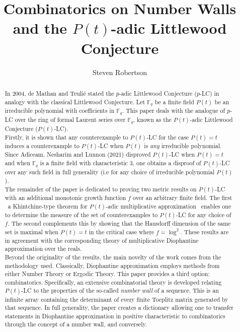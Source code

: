 \documentclass{article}
\title{Combinatorics on Number Walls and the $P(t)$-adic Littlewood Conjecture}
\author{Steven Robertson}
\date{}
\theoremstyle{definition}
\newcommand{\F}{\mathbb{F}}
\numberwithin{equation}{subsection}
\begin{document}
\maketitle
\begin{abstract}
    \noindent In 2004, de Mathan and Teulié stated the $p$-adic Littlewood Conjecture ($p$-LC) in analogy with the classical Littlewood Conjecture. Let $\F_q$ be a finite field $P(t)$ be an irreducible polynomial with coefficients in $\F_q$. This paper deals with the analogue of $p$-LC over the ring of formal Laurent series over $\F_q$, known as the $P(t)$-adic Littlewood Conjecture ($P(t)$-LC). \\

    \noindent Firstly, it is shown that any counterexample to $P(t)$-LC for the case $P(t)=t$ induces a counterexample to $P(t)$-LC when $P(t)$ is \textit{any} irreducible polynomial. Since Adiceam, Nesharim and Lunnon (2021) disproved $P(t)$-LC when $P(t)=t$ and when $\F_q$ is a finite field with characteristic 3, one obtains a disproof of $P(t)$-LC over any such field in full generality (i.e for any choice of irreducible polynomial $P(t)$).\\

    \noindent The remainder of the paper is dedicated to proving two metric results on $P(t)$-LC with an additional monotonic growth function $f$ over an arbitrary finite field. The first \textendash ~a Khintchine-type theorem for $P(t)$-adic multiplicative approximation \textendash ~enables one to determine the measure of the set of counterexamples to $P(t)$-LC for any choice of $f$. The second complements this by showing that the Hausdorff dimension of the same set is maximal when $P(t)=t$ in the critical case where $f=\log^2$. These results are in agreement with the corresponding theory of multiplicative Diophantine approximation over the reals.\\
    
    \noindent Beyond the originality of the results, the main novelty of the work comes from the methodology used. Classically, Diophantine approximation employs methods from either Number Theory or Ergodic Theory. This paper provides a third option: combinatorics. Specifically, an extensive combinatorial theory is developed relating $P(t)$-LC to the properties of the so-called \textit{number wall} of a sequence. This is an infinite array containing the determinant of every finite Toeplitz matrix generated by that sequence. In full generality, the paper creates a dictionary allowing one to transfer statements in Diophantine approximation in positive characteristic to combinatorics through the concept of a number wall, and conversely. \\

\end{abstract}
\tableofcontents
\end{document}
